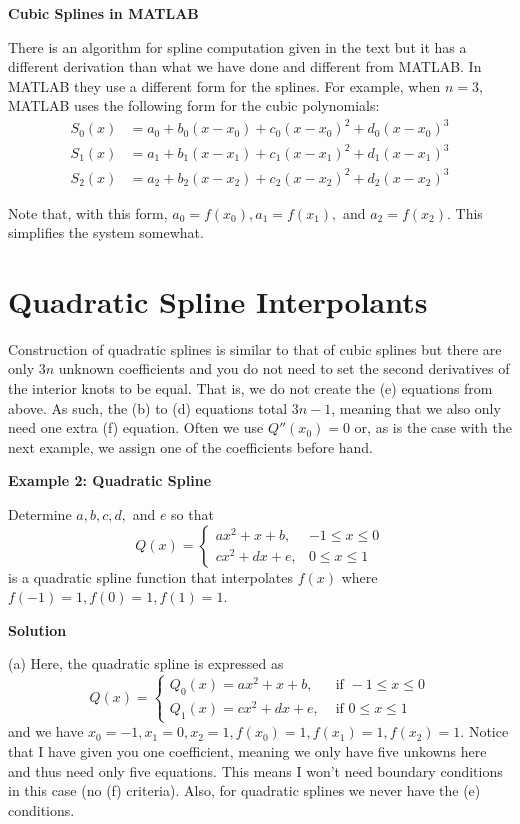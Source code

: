 \documentclass [titlepage,12pt,letter] {article}
\begin{document}
{\bf Cubic Splines in MATLAB}

There is an algorithm for spline computation given in the text but it has a different derivation than what we have done and different from MATLAB. In MATLAB they use a different form for the splines. For example, when $n=3$, MATLAB uses the following form for the cubic polynomials:
\begin{align*}
     S_0(x) &= a_0+b_0(x-x_0)+c_0(x-x_0)^2+d_0(x-x_0)^3 \\
     S_1(x) &= a_1+b_1(x-x_1)+c_1(x-x_1)^2+d_1(x-x_1)^3 \\
     S_2(x) &= a_2+b_2(x-x_2)+c_2(x-x_2)^2+d_2(x-x_2)^3
\end{align*}


Note that, with this form, $a_0=f(x_0), a_1=f(x_1),$ and $a_2=f(x_2)$. This simplifies the system somewhat. 

\section{Quadratic Spline Interpolants}
Construction of quadratic splines is similar to that of cubic splines but there are only $3n$ unknown coefficients and you do not need to set the second derivatives of the interior knots to be equal. That is, we do not create the (e) equations from above. As such, the (b) to (d) equations total $3n-1$, meaning that we also only need one extra (f) equation. Often we use $Q''(x_0)=0$ or, as is the case with the next example, we assign one of the coefficients before hand.

\noindent
{\bf Example 2: Quadratic Spline}

\noindent
Determine $a,b,c,d,$ and $e$ so that
\[
Q(x) = \left\{
\begin{array}{ll}
      ax^2+x+b, & -1 \leq x\leq 0 \\
     cx^2+dx+e, & 0 \leq x\leq 1 
\end{array}
\right. \]
is a quadratic spline function that interpolates $f(x)$ where $f(-1)=1, f(0)=1,f(1)=1$.


\noindent
{\bf Solution}

(a) Here, the quadratic spline is expressed as
\[
Q(x) = \begin{cases}
Q_0(x)=ax^2+x+b, & \text{ if } -1 \leq x \leq 0 \\
Q_1(x)=cx^2+dx+e, & \text{ if } 0 \leq x \leq 1
\end{cases}
\]
and we have $x_0=-1,x_1=0,x_2=1,f(x_0)=1,f(x_1)=1,f(x_2)=1$. Notice that I have given you one coefficient, meaning we only have five unkowns here and thus need only five equations. This means I won't need boundary conditions in this case (no (f) criteria). Also, for quadratic splines we never have the (e) conditions.
\end{document}
